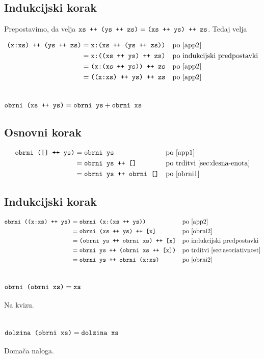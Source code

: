 \documentclass[11pt,a4paper]{article}
\begin{document}
\subsection*{Indukcijski korak}

Prepostavimo, da velja $\mbox{\texttt{xs ++ (ys ++ zs)}} = \mbox{\texttt{(xs ++ ys) ++ zs}}$. Tedaj velja

\begin{align*}
  \mbox{\texttt{(x:xs) ++ (ys ++ zs)}}
  &= \mbox{\texttt{x:(xs ++ (ys ++ zs))}}
    &&\text{po \eqref{app2}} \\
  &= \mbox{\texttt{x:((xs ++ ys) ++ zs)}}
    &&\text{po indukcijski predpostavki} \\
  &= \mbox{\texttt{(x:(xs ++ ys)) ++ zs}}
    &&\text{po \eqref{app2}} \\
  &= \mbox{\texttt{((x:xs) ++ ys) ++ zs}}
    &&\text{po \eqref{app2}}
\end{align*}


\section{$\mbox{\texttt{obrni (xs ++ ys)}} = \mbox{\texttt{obrni ys}} + \mbox{\texttt{obrni xs}}$}

\subsection*{Osnovni korak}

\begin{align*}
  \mbox{\texttt{obrni ([] ++ ys)}}
  &= \mbox{\texttt{obrni ys}}
    &&\text{po \eqref{app1}} \\
  &= \mbox{\texttt{obrni ys ++ []}}
    &&\text{po trditvi~\ref{sec:desna-enota}} \\
  &= \mbox{\texttt{obrni ys ++ obrni []}}
    &&\text{po \eqref{obrni1}}
\end{align*}

\subsection*{Indukcijski korak}

\begin{align*}
  \mbox{\texttt{obrni ((x:xs) ++ ys)}}
  &= \mbox{\texttt{obrni (x:(xs ++ ys))}}
    &&\text{po \eqref{app2}} \\
  &= \mbox{\texttt{obrni (xs ++ ys) ++ [x]}}
    &&\text{po \eqref{obrni2}} \\
  &= \mbox{\texttt{(obrni ys ++ obrni xs) ++ [x]}}
    &&\text{po indukcijski predpostavki} \\
  &= \mbox{\texttt{obrni ys ++ (obrni xs ++ [x])}}
    &&\text{po trditvi~\ref{sec:asociativnost}} \\
  &= \mbox{\texttt{obrni ys ++ obrni (x:xs)}}
    &&\text{po \eqref{obrni2}}
\end{align*}


\section{$\mbox{\texttt{obrni (obrni xs)}} = \mbox{\texttt{xs}}$}

Na kvizu.

\section{$\mbox{\texttt{dolzina (obrni xs)}} = \mbox{\texttt{dolzina xs}}$}

Domača naloga.
\end{document}
